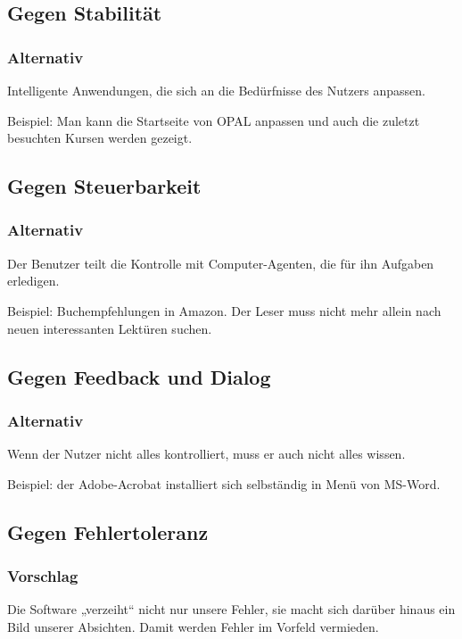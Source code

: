 \subsection{Gegen Stabilität}
\subsubsection*{Alternativ}
Intelligente Anwendungen, die sich an die Bedürfnisse des Nutzers anpassen.

Beispiel: Man kann die Startseite von OPAL anpassen und auch die zuletzt besuchten Kursen werden gezeigt.

\subsection{Gegen Steuerbarkeit}
\subsubsection*{Alternativ}
Der Benutzer teilt die Kontrolle mit Computer-Agenten, die für ihn Aufgaben erledigen.

Beispiel: Buchempfehlungen in Amazon. Der Leser muss nicht mehr allein nach neuen interessanten Lektüren suchen.

\subsection{Gegen Feedback und Dialog}
\subsubsection*{Alternativ}
Wenn der Nutzer nicht alles kontrolliert, muss er auch nicht alles wissen.

Beispiel: der Adobe-Acrobat installiert sich selbständig in Menü von MS-Word.


\subsection{Gegen Fehlertoleranz}
\subsubsection*{Vorschlag}
Die Software „verzeiht“ nicht nur unsere Fehler, sie macht sich darüber hinaus ein Bild unserer Absichten. Damit werden Fehler im Vorfeld vermieden.

